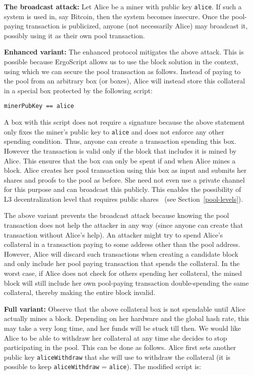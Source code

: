 \documentclass{llncs}
\newcommand{\langname}{ErgoScript\xspace}
\begin{document}
\textbf{The broadcast attack:} Let Alice be a miner with public key \texttt{alice}. If such a system is used in, say Bitcoin, then the system becomes insecure. Once the pool-paying transaction is publicized, anyone (not necessarily Alice) may broadcast it, possibly using it as their own pool transaction. 

\textbf{Enhanced variant:} The enhanced protocol mitigates the above attack. This is possible because \langname allows us to use the block solution in the context, using which we can secure the pool transaction as follows. Instead of paying to the pool from an arbitrary box (or boxes), Alice will instead store this collateral in a special box protected by the following script:
\begin{verbatim}
minerPubKey == alice
\end{verbatim}

A box with this script does not require a signature because the above statement only fixes the miner's public key to \texttt{alice} and does not enforce any other spending condition. Thus, anyone can create a transaction spending this box. However the transaction is valid only if the block that includes it is mined by Alice. 
This ensures that the box can only be spent if and when Alice mines a block.  
Alice creates her pool transaction using this box as input and submits her shares and proofs to the pool as before. She need not even use a private channel for this purpose and can broadcast this publicly. This enables the possibility of L3 decentralization level that requires public shares~\cite{chesterman2018p2pool,luu2017smartpool} (see Section~\ref{pool-levels}).

The above variant prevents the broadcast attack because knowing the pool transaction does not help the attacker in any way (since anyone can create that transaction without Alice's help). An attacker might try to spend Alice's collateral in a transaction paying to some address other than the pool address. However, Alice will discard such transactions when creating a candidate block and only include her pool paying transaction that spends the collateral. In the worst case, if Alice does not check for others spending her collateral, the mined block will still include her own pool-paying transaction double-spending the same collateral, thereby making the entire block invalid. 

\textbf{Full variant:} Observe that the above collateral box is not spendable until Alice actually mines a block. Depending on her hardware and the global hash rate, this may take a very long time, and her funds will be stuck till then. We would like Alice to be able to withdraw her collateral at any time she decides to stop participating in the pool. This can be done as follows. Alice first sets another public key \texttt{aliceWithdraw} that she will use to withdraw the collateral (it is possible to keep \texttt{aliceWithdraw} = \texttt{alice}). The modified script is:
\end{document}
